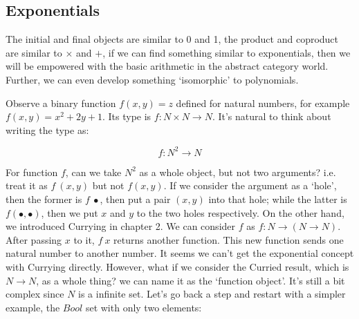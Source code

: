 \documentclass{article}
\begin{document}
\begin{Exercise}
\end{Exercise}

\subsection{Exponentials}

The initial and final objects are similar to 0 and 1, the product and coproduct are similar to $\times$ and $+$, if we can find something similar to exponentials, then we will be empowered with the basic arithmetic in the abstract category world. Further, we can even develop something `isomorphic' to polynomials.

Observe a binary function $f(x, y) = z$ defined for natural numbers, for example $f(x, y) = x^2 + 2y + 1$. Its type is $f: N \times N \to N$. It's natural to think about writing the type as:

\[
f : N^2 \to N
\]

For function $f$, can we take $N^2$ as a whole object, but not two arguments? i.e. treat it as $f\ (x, y)$ but not $f(x, y)$. If we consider the argument as a `hole', then the former is $f\ \bullet$, then put a pair $(x, y)$ into that hole; while the latter is $f(\bullet, \bullet)$, then we put $x$ and $y$ to the two holes respectively. On the other hand, we introduced Currying in chapter 2. We can consider $f$ as $f: N \to (N \to N)$. After passing $x$ to it, $f\ x$ returns another function. This new function sends one natural number to another number. It seems we can't get the exponential concept with Currying directly. However, what if we consider the Curried result, which is $N \to N$, as a whole thing? we can name it as the `function object'. It's still a bit complex since $N$ is a infinite set. Let's go back a step and restart with a simpler example, the $Bool$ set with only two elements:
\end{document}
